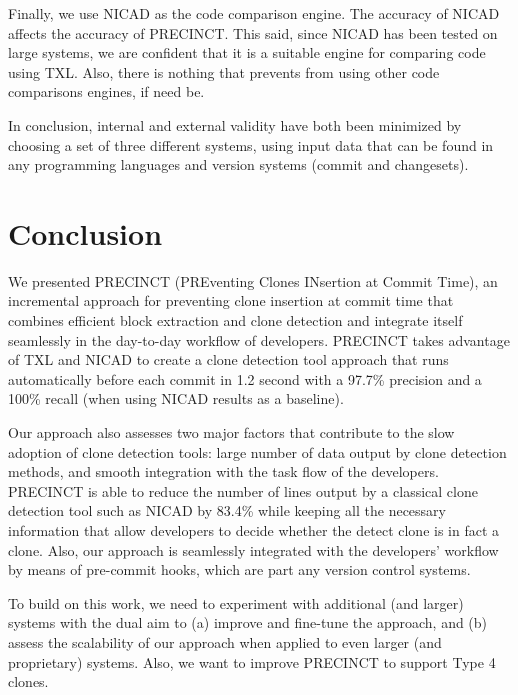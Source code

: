 \documentclass[conference]{IEEEtran}
\begin{document}
Finally, we use NICAD as the code comparison engine. The accuracy of NICAD affects the accuracy of PRECINCT. This said, since NICAD has been tested on large systems, we are confident that it is a suitable engine for comparing code using TXL. Also, there is nothing that prevents from using other code comparisons engines, if need be. 

In conclusion, internal and external validity have both been minimized by choosing a set of three different systems, using input data that can be found in any programming languages and version systems (commit and changesets).



\section{Conclusion}
\label{sec:Conclusion}

We presented PRECINCT (PREventing Clones INsertion at Commit Time), an incremental approach for preventing clone insertion at commit time that combines efficient block extraction and clone detection and integrate itself seamlessly in the day-to-day workflow of developers.
PRECINCT takes advantage of TXL and NICAD to create a clone detection tool approach that runs automatically before each commit in 1.2 second with a 97.7\% precision and a 100\% recall (when using NICAD results as a baseline).

Our approach also assesses two major factors that contribute to the slow adoption of clone detection tools: large number of data output by clone detection methods,  and  smooth integration with the task flow of the developers.
PRECINCT is able to reduce the number of lines output by a classical clone detection tool such as NICAD by 83.4\% while keeping all the necessary information that allow developers to decide whether the detect clone is in fact a clone.
Also, our approach is seamlessly integrated with the developers' workflow by means of pre-commit hooks, which are part any version control systems.

To build on this work, we need to experiment with additional (and larger) systems with the dual aim to (a) improve and fine-tune the approach, and (b) assess the scalability of our approach when applied to even larger (and proprietary) systems. Also, we want to improve PRECINCT to support Type 4 clones.




\end{document}
